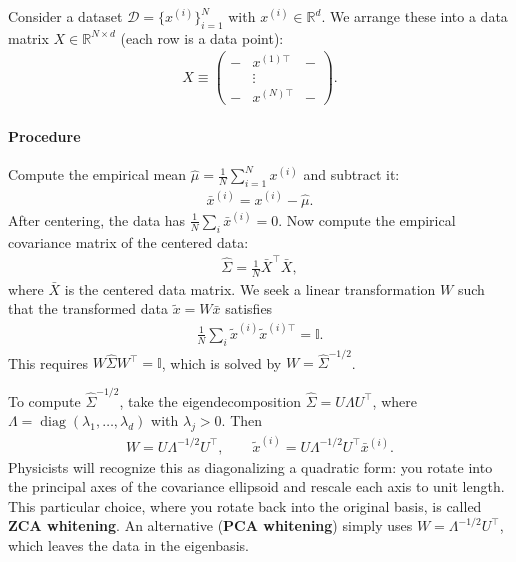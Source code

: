 Consider a dataset $\mathcal{D} = \{x^{(i)}\}_{i=1}^{N}$ with $x^{(i)} \in \mathbb{R}^d$.
We arrange these into a data matrix $X \in \mathbb{R}^{N \times d}$ (each row is a data point):
\begin{align}
	X \equiv \begin{pmatrix}
		- & x^{(1)\top} & - \\
		  & \vdots      &   \\
		- & x^{(N)\top} & -
	\end{pmatrix}.
\end{align}

\paragraph{Procedure}
Compute the empirical mean $\hat{\mu} = \frac{1}{N}\sum_{i=1}^{N} x^{(i)}$ and subtract it:
\begin{align}
	\bar{x}^{(i)} = x^{(i)} - \hat{\mu}.
\end{align}
After centering, the data has $\frac{1}{N}\sum_i \bar{x}^{(i)} = 0$. Now compute the empirical covariance matrix of the centered data:
\begin{align}
	\hat{\Sigma} = \frac{1}{N} \bar{X}^\top \bar{X},
\end{align}
where $\bar{X}$ is the centered data matrix. We seek a linear transformation $W$ such that the transformed data $\tilde{x} = W \bar{x}$ satisfies
\begin{align}
	\frac{1}{N} \sum_i \tilde{x}^{(i)} \tilde{x}^{(i)\top} = \mathbb I.
\end{align}
This requires $W \hat{\Sigma} W^\top = \mathbb I$, which is solved by $W = \hat{\Sigma}^{-1/2}$.

To compute $\hat{\Sigma}^{-1/2}$, take the eigendecomposition $\hat{\Sigma} = U \Lambda U^\top$, where $\Lambda = \operatorname{diag}(\lambda_1, \dots, \lambda_d)$ with $\lambda_j > 0$.
Then
\begin{align}
	W = U \Lambda^{-1/2} U^\top, \qquad \tilde{x}^{(i)} = U \Lambda^{-1/2} U^\top \bar{x}^{(i)}.
\end{align}
Physicists will recognize this as diagonalizing a quadratic form: you rotate into the principal axes of the covariance ellipsoid and rescale each axis to unit length. This particular choice, where you rotate back into the original basis, is called \textbf{ZCA whitening}. An alternative (\textbf{PCA whitening}) simply uses $W = \Lambda^{-1/2} U^\top$, which leaves the data in the eigenbasis.

